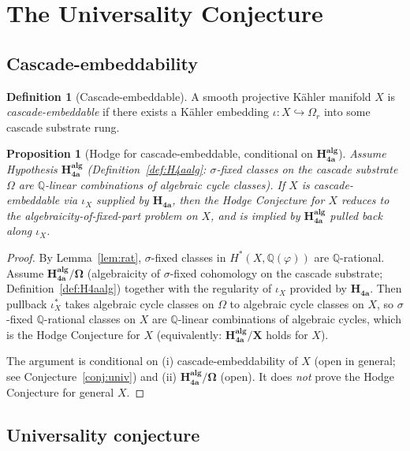 \documentclass[11pt, a4paper]{amsart}
\newtheorem{proposition}[theorem]{Proposition}
\theoremstyle{definition}
\newtheorem{definition}[theorem]{Definition}
\newcommand{\Q}{\mathbb{Q}}
\newcommand{\pphi}{\varphi}
\begin{document}
\section{The Universality Conjecture}\label{sec:univ}

\subsection{Cascade-embeddability}

\begin{definition}[Cascade-embeddable]
A smooth projective Kähler manifold $X$ is \emph{cascade-embeddable}
if there exists a Kähler embedding $\iota: X \hookrightarrow \Omega_r$
into some cascade substrate rung.
\end{definition}

\begin{proposition}[Hodge for cascade-embeddable, conditional on $\mathbf{H_{4a}^{alg}}$]\label{prop:embedhodge}
Assume Hypothesis $\mathbf{H_{4a}^{alg}}$
(Definition~\ref{def:H4aalg}: $\sigma$-fixed classes on the cascade
substrate $\Omega$ are $\Q$-linear combinations of algebraic cycle
classes). If $X$ is cascade-embeddable via $\iota_X$ supplied by
$\mathbf{H_{4a}}$, then the Hodge Conjecture for $X$ reduces to the
algebraicity-of-fixed-part problem on $X$, and is implied by
$\mathbf{H_{4a}^{alg}}$ pulled back along $\iota_X$.
\end{proposition}

\begin{proof}
By Lemma~\ref{lem:rat}, $\sigma$-fixed classes in
$H^*(X, \Q(\pphi))$ are $\Q$-rational.  Assume
$\mathbf{H_{4a}^{alg}\!\!/\Omega}$ (algebraicity of $\sigma$-fixed
cohomology on the cascade substrate; Definition~\ref{def:H4aalg})
together with the regularity of $\iota_X$ provided by
$\mathbf{H_{4a}}$.  Then pullback $\iota_X^*$ takes algebraic
cycle classes on $\Omega$ to algebraic cycle classes on $X$, so
$\sigma$-fixed $\Q$-rational classes on $X$ are $\Q$-linear
combinations of algebraic cycles, which is the Hodge Conjecture
for $X$ (equivalently: $\mathbf{H_{4a}^{alg}\!\!/X}$ holds for $X$).

The argument is conditional on (i) cascade-embeddability of $X$
(open in general; see Conjecture~\ref{conj:univ}) and (ii)
$\mathbf{H_{4a}^{alg}\!\!/\Omega}$ (open). It does \emph{not}
prove the Hodge Conjecture for general $X$.
\end{proof}

\subsection{Universality conjecture}
\end{document}
